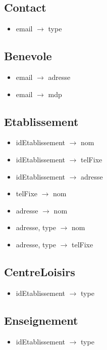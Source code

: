 \documentclass[asi, sansVersion]{picInsa}
\begin{document}
\subsection*{Contact}
\begin{itemize}
\item[] email $\rightarrow$ type 
\end{itemize}

\subsection*{Benevole}
\begin{itemize}
\item[] email $\rightarrow$ adresse 
\item[] email $\rightarrow$ mdp 
\end{itemize}


\subsection*{Etablissement}
\begin{itemize}
\item[] idEtablissement $\rightarrow$ nom 
\item[] idEtablissement $\rightarrow$ telFixe
\item[] idEtablissement $\rightarrow$ adresse
\item[] telFixe $\rightarrow$ nom
\item[] adresse $\rightarrow$ nom
\item[] adresse, type $\rightarrow$ nom
\item[] adresse, type $\rightarrow$ telFixe
\end{itemize}

\subsection*{CentreLoisirs}
\begin{itemize}
\item[]	idEtablissement $\rightarrow$ type
\end{itemize}

\subsection*{Enseignement}
\begin{itemize}
\item[]	idEtablissement $\rightarrow$ type
\end{itemize}
\end{document}
